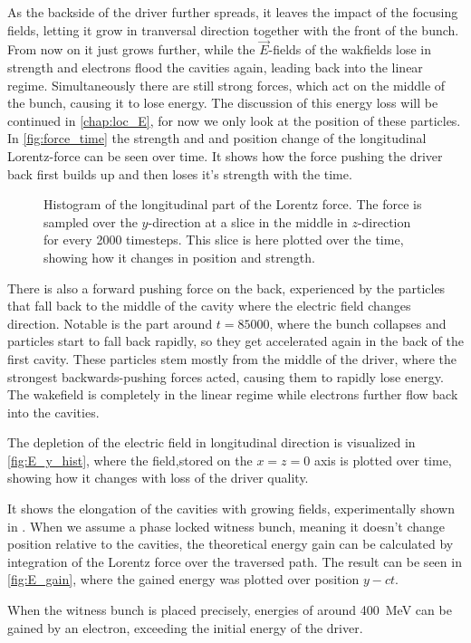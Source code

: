 \documentclass[bachelor_thesis]{subfiles}
\begin{document}
As the backside of the driver further spreads, it leaves the impact of the focusing fields, letting it grow in tranversal direction together with the front of the bunch. From now on it just grows further, while the $\vec{E}$-fields of the wakfields lose in strength and electrons flood the cavities again, leading back into the linear regime.
Simultaneously there are still strong forces, which act on the middle of the bunch, causing it to lose energy. The discussion of this energy loss will be continued in \autoref{chap:loc_E}, for now we only look at the position of these particles.
In \autoref{fig:force_time} the strength and and position change of the longitudinal Lorentz-force can be seen over time. It shows how the force pushing the driver back first builds up and then loses it's strength with the time.
\begin{figure}
	\centering
	\missingfigure{}
	\caption{Histogram of the longitudinal part of the Lorentz force. The force is sampled over the $y$-direction at a slice in the middle in $z$-direction for every 2000 timesteps. This slice is here plotted over the time, showing how it changes in position and strength.}
	\label{fig:force_time}
\end{figure}
There is also a forward pushing force on the back, experienced by the particles that fall back to the middle of the cavity where the electric field changes direction. Notable is the part around $t=85000$, where the bunch collapses and particles start to fall back rapidly,
so they get accelerated again in the back of the first cavity. These particles stem mostly from the middle of the driver, where the strongest backwards-pushing forces acted, causing them to rapidly lose energy.
The wakefield is completely in the linear regime while electrons further flow back into the cavities.

The depletion of the electric field in longitudinal direction is visualized in \autoref{fig:E_y_hist}, where the field,stored on the $x=z=0$ axis is plotted over time, showing how it changes with loss of the driver quality.
\begin{figure}
	\centering
	\missingfigure{}
	\caption{}
	\label{fig:E_y_hist}
\end{figure}
It shows the elongation of the cavities with growing fields, experimentally shown in \cite{Schoebel2022}. When we assume a phase locked witness bunch, meaning it doesn't change position relative to the cavities, the theoretical energy gain can be calculated 
by integration of the Lorentz force over the traversed path. The result can be seen in \autoref{fig:E_gain}, where the gained energy was plotted over position $y-ct$.
\begin{figure}
	\centering
	\caption{}
	\label{fig:E_gain}
\end{figure}
When the witness bunch is placed precisely, energies of around \qty{400}{\MeV} can be gained by an electron, exceeding the initial energy of the driver.
\end{document}
